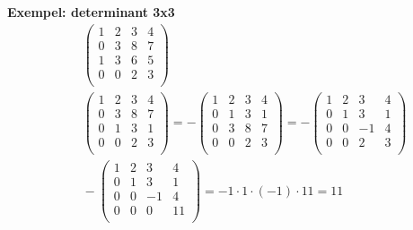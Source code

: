 \textbf{Exempel: determinant 3x3 }
\begin{align*}
  &\quad  
  \left(\begin{array}{cccc}
    1 & 2 & 3 & 4  \\
    0 & 3 & 8 & 7  \\
    1 & 3 & 6 & 5  \\
    0 & 0 & 2 & 3  \\
  \end{array}\right) \\
  &\quad
  \left(\begin{array}{cccc}
    1 & 2 & 3 & 4  \\
    0 & 3 & 8 & 7  \\
    0 & 1 & 3 & 1  \\
    0 & 0 & 2 & 3  \\
  \end{array}\right) =
  -\left(\begin{array}{cccc}
    1 & 2 & 3 & 4  \\
    0 & 1 & 3 & 1  \\
    0 & 3 & 8 & 7  \\
    0 & 0 & 2 & 3  \\
  \end{array}\right) =
  -\left(\begin{array}{cccc}
    1 & 2 & 3  & 4  \\
    0 & 1 & 3  & 1  \\
    0 & 0 & -1 & 4  \\
    0 & 0 & 2  & 3  \\
  \end{array}\right) \\
  &\quad
    -\left(\begin{array}{cccc}
    1 & 2 & 3  & 4   \\
    0 & 1 & 3  & 1   \\
    0 & 0 & -1 & 4   \\
    0 & 0 & 0  & 11  \\
  \end{array}\right) = -1\cdot{1}\cdot{(-1)}\cdot{11} = 11 \\
\end{align*}


